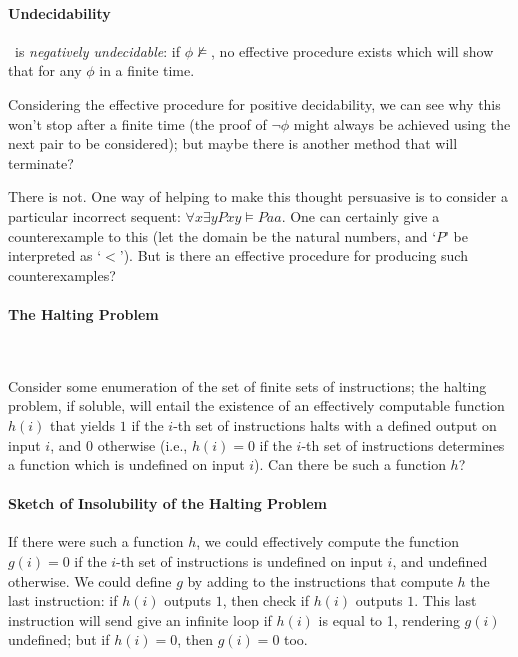 \paragraph{Undecidability}

\begin{theorem}
	\ltwo\ is \emph{negatively undecidable}: if $\phi\not\vDash$, no effective procedure exists which will show that for any $\phi$ in a finite time.
\end{theorem} Considering the effective procedure for positive decidability, we can see why this won't stop after a finite time (the proof of $\neg\phi$ might always be achieved using the next pair to be considered); but maybe there is another method that will terminate?  

There is not.  One way of helping to make this thought persuasive is to consider a particular incorrect sequent:  $\forall x \exists y Pxy \vDash Paa$. One can certainly give a counterexample to this (let the domain be the natural numbers, and `$P$' be interpreted as `$<$'). But is there an effective procedure for producing such counterexamples?


\paragraph{The Halting Problem}

~

 Consider some enumeration of the set of finite sets of instructions; the halting problem, if soluble, will entail the existence of an effectively computable function $h(i)$ that yields $1$ if the $i$-th set of instructions halts with a defined output on input $i$, and $0$ otherwise (i.e., $h(i) =0$ if the $i$-th set of instructions determines a function which is undefined on input $i$). Can there be such a function $h$?


\paragraph{Sketch of Insolubility of the Halting Problem}

If there were such a function $h$, we could effectively compute the function $g(i) = 0$ if the $i$-th set of instructions is undefined on input $i$, and undefined otherwise. We could define $g$ by adding to the instructions that compute $h$ the last instruction: if $h(i)$ outputs $1$, then check if $h(i)$ outputs $1$. This last instruction will send give an infinite loop if $h(i)$ is equal to 1, rendering $g(i)$ undefined; but if $h(i)=0$, then $g(i)=0$ too. 

